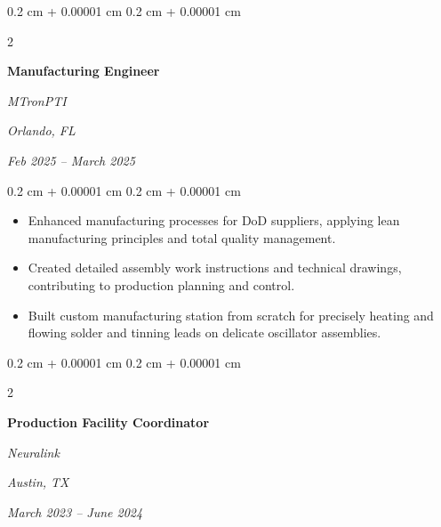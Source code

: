 \documentclass[10pt, letterpaper]{article}
\newenvironment{highlights}{
    \begin{itemize}[
        topsep=0.10 cm,
        parsep=0.10 cm,
        partopsep=0pt,
        itemsep=0pt,
        leftmargin=0.4 cm + 10pt
    ]
}{
    \end{itemize}
} %
\newenvironment{onecolentry}{
    \begin{adjustwidth}{
        0.2 cm + 0.00001 cm
    }{
        0.2 cm + 0.00001 cm
    }
}{
    \end{adjustwidth}
} %
\newenvironment{twocolentry}[2][]{
    \onecolentry
    \def\secondColumn{#2}
    \setcolumnwidth{\fill, 4.5 cm}
    \begin{paracol}{2}
}{
    \switchcolumn \raggedleft \secondColumn
    \end{paracol}
    \endonecolentry
} %
\begin{document}
        \vspace{0.35 cm}

        
        \begin{twocolentry}{
        \textit{Orlando, FL}    
            
        \textit{Feb 2025 – March 2025}}
            \textbf{Manufacturing Engineer}
            
            \textit{MTronPTI}
        \end{twocolentry}

        \vspace{0.10 cm}
        \begin{onecolentry}
            \begin{highlights}
                \item Enhanced manufacturing processes for DoD suppliers, applying lean manufacturing principles and total quality management.
                \item Created detailed assembly work instructions and technical drawings, contributing to production planning and control.
                \item Built custom manufacturing station from scratch for precisely heating and flowing solder and tinning leads on delicate oscillator assemblies.
            \end{highlights}
        \end{onecolentry}


        \vspace{0.35 cm}

        \begin{twocolentry}{
        \textit{Austin, TX}    
            
        \textit{March 2023 – June 2024}}
            \textbf{Production Facility Coordinator}
            
            \textit{Neuralink}
        \end{twocolentry}
\end{document}
